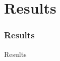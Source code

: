 \section{Results}

\begin{frame}
    \frametitle{Results}
    \begin{block}{Results}
    \end{block}
\end{frame}
